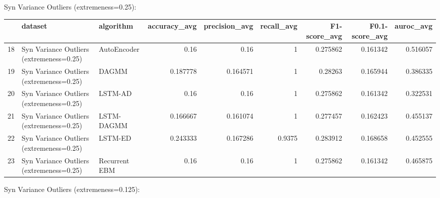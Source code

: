 Syn Variance Outliers (extremeness=0.25):

\begin{tabular}{rllrrrrrr}
\hline
    & dataset                                  & algorithm     &   accuracy\_avg &   precision\_avg &   recall\_avg &   F1-score\_avg &   F0.1-score\_avg &   auroc\_avg \\
\hline
 18 & Syn Variance Outliers (extremeness=0.25) & AutoEncoder   &       0.16     &        0.16     &       1      &       0.275862 &         0.161342 &    0.516057 \\
 19 & Syn Variance Outliers (extremeness=0.25) & DAGMM         &       0.187778 &        0.164571 &       1      &       0.28263  &         0.165944 &    0.386335 \\
 20 & Syn Variance Outliers (extremeness=0.25) & LSTM-AD       &       0.16     &        0.16     &       1      &       0.275862 &         0.161342 &    0.322531 \\
 21 & Syn Variance Outliers (extremeness=0.25) & LSTM-DAGMM    &       0.166667 &        0.161074 &       1      &       0.277457 &         0.162423 &    0.455137 \\
 22 & Syn Variance Outliers (extremeness=0.25) & LSTM-ED       &       0.243333 &        0.167286 &       0.9375 &       0.283912 &         0.168658 &    0.452555 \\
 23 & Syn Variance Outliers (extremeness=0.25) & Recurrent EBM &       0.16     &        0.16     &       1      &       0.275862 &         0.161342 &    0.465875 \\
\hline
\end{tabular}

Syn Variance Outliers (extremeness=0.125):

